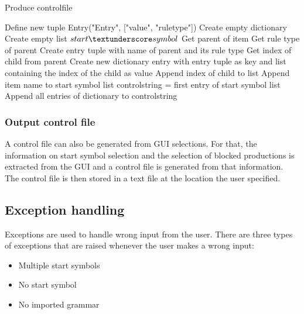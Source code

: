\begin{algorithm}[H]
\caption{Produce controlfile}
\label{alg:produceControlfile}
\begin{algorithmic}[1] 
\State Define new tuple Entry("Entry", ["value", "rule\textunderscore type"])
\State Create empty dictionary
\State Create empty list $start\textunderscore symbol$
	\State Get parent of item
		\State Get rule type of parent
		\State Create entry tuple with name of parent and its rule type
		\State Get index of child from parent
			\State Create new dictionary entry with entry tuple as key and list containing the index of the child as value
		\Else
			\State Append index of child to list
		\EndIf
		\State Append item name to start symbol list
	\EndIf
\EndFor
\State control\textunderscore string = first entry of start symbol list
\State Append all entries of dictionary to control\textunderscore string
\end{algorithmic}
\end{algorithm} 

\subsubsection{Output control file}\label{sec:ImplementationGUIOutput control file}
A control file can also be generated from GUI selections.
For that, the information on start symbol selection and the selection of blocked productions is extracted from the GUI and a control file is generated from that information. The control file is then stored in a text file at the location the user specified.

\subsection{Exception handling}\label{sec:ImplementationGUIExceptionHandling}

Exceptions are used to handle wrong input from the user. There are three types of exceptions that are raised whenever the user makes a wrong input: 

\begin{itemize}
\item Multiple start symbols
\item No start symbol
\item No imported grammar
\end{itemize}

